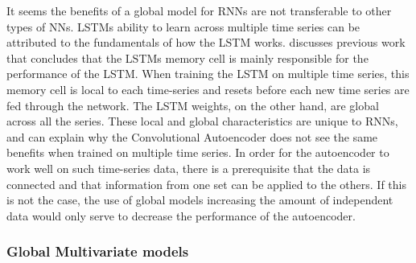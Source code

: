 It seems the benefits of a global model for RNNs are not transferable to other types
of NNs. LSTMs ability to learn across multiple time series can be attributed to the fundamentals
of how the LSTM works. \cite{Zhao2019} discusses previous work that concludes that
the LSTMs memory cell is mainly responsible for the performance of the LSTM.
When training the LSTM on multiple time series, this memory cell is local to each
time-series and resets before each new time series are fed through the network.
The LSTM weights, on the other hand, are global across all the series.
These local and global characteristics are unique to RNNs, and can explain
why the Convolutional Autoencoder does not see the same benefits when trained on multiple
time series.
In order for the autoencoder to work well on such time-series data,
there is a prerequisite that the data is connected and that information from one set can be applied to the others.
If this is not the case, the use of global models increasing the amount of independent data would only serve to decrease the performance of the autoencoder.








\subsubsection{Global Multivariate models}


